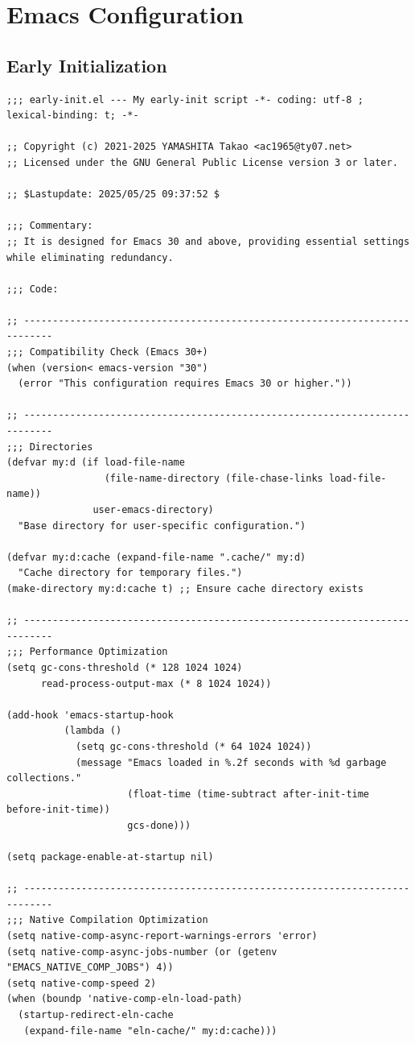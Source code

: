 \documentclass[11pt]{article}
\begin{document}
\section{Emacs Configuration}
\label{sec:org3ed67ea}
\subsection{Early Initialization}
\label{sec:org247101c}

\begin{verbatim}
;;; early-init.el --- My early-init script -*- coding: utf-8 ; lexical-binding: t; -*-

;; Copyright (c) 2021-2025 YAMASHITA Takao <ac1965@ty07.net>
;; Licensed under the GNU General Public License version 3 or later.

;; $Lastupdate: 2025/05/25 09:37:52 $

;;; Commentary:
;; It is designed for Emacs 30 and above, providing essential settings while eliminating redundancy.

;;; Code:

;; ---------------------------------------------------------------------------
;;; Compatibility Check (Emacs 30+)
(when (version< emacs-version "30")
  (error "This configuration requires Emacs 30 or higher."))

;; ---------------------------------------------------------------------------
;;; Directories
(defvar my:d (if load-file-name
                 (file-name-directory (file-chase-links load-file-name))
               user-emacs-directory)
  "Base directory for user-specific configuration.")

(defvar my:d:cache (expand-file-name ".cache/" my:d)
  "Cache directory for temporary files.")
(make-directory my:d:cache t) ;; Ensure cache directory exists

;; ---------------------------------------------------------------------------
;;; Performance Optimization
(setq gc-cons-threshold (* 128 1024 1024)
      read-process-output-max (* 8 1024 1024))

(add-hook 'emacs-startup-hook
          (lambda ()
            (setq gc-cons-threshold (* 64 1024 1024))
            (message "Emacs loaded in %.2f seconds with %d garbage collections."
                     (float-time (time-subtract after-init-time before-init-time))
                     gcs-done)))

(setq package-enable-at-startup nil)

;; ---------------------------------------------------------------------------
;;; Native Compilation Optimization
(setq native-comp-async-report-warnings-errors 'error)
(setq native-comp-async-jobs-number (or (getenv "EMACS_NATIVE_COMP_JOBS") 4))
(setq native-comp-speed 2)
(when (boundp 'native-comp-eln-load-path)
  (startup-redirect-eln-cache
   (expand-file-name "eln-cache/" my:d:cache)))


\end{verbatim}
\end{document}
